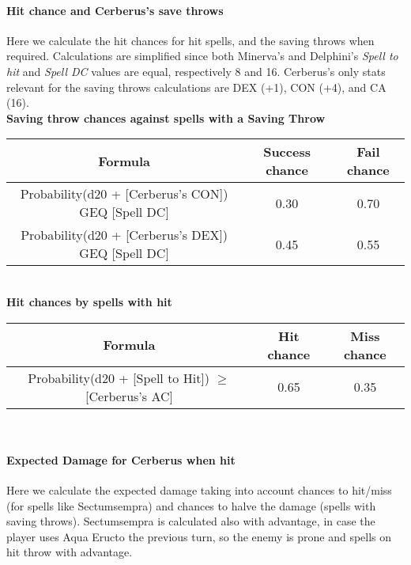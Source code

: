 \paragraph{Hit chance and Cerberus's save throws} Here we calculate the hit chances for hit spells, and the saving throws when required.
Calculations are simplified since both Minerva's and Delphini's \textit{Spell to hit} and \textit{Spell DC} values are equal, respectively 8 and 16.
Cerberus's only stats relevant for the saving throws calculations are DEX (+1), CON (+4), and CA (16). \\

\textbf{Saving throw chances against spells with a Saving Throw}\\

\begin{tabular}{c|cc}
	\textbf{Formula} & \textbf{Success chance} & \textbf{Fail chance} \\ \hline
	Probability(d20 + [Cerberus's CON]) GEQ [Spell DC]      & 0.30 & 0.70 \\
	Probability(d20 + [Cerberus's DEX]) GEQ [Spell DC]      & 0.45 & 0.55 \\ \hline
\end{tabular} \\

\textbf{Hit chances by spells with hit}\\

\begin{tabular}{c|cc}
	\textbf{Formula} & \textbf{Hit chance} & \textbf{Miss chance} \\ \hline
	Probability(d20 + [Spell to Hit]) $\geq$ [Cerberus's AC]   & 0.65 & 0.35 \\ \hline
\end{tabular}\\

\paragraph{Expected Damage for Cerberus when hit} Here we calculate the expected damage taking into account chances to hit/miss (for spells like Sectumsempra) and chances to halve the damage (spells with saving throws). Sectumsempra is calculated also with advantage, in case the player uses Aqua Eructo the previous turn, so the enemy is prone and spells on hit throw with advantage.\\

